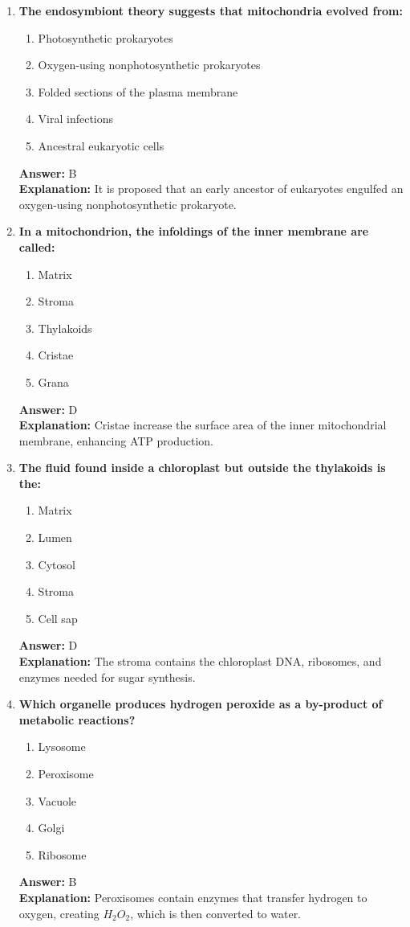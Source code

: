 \documentclass[11pt, a4paper]{article}
\begin{document}
\begin{enumerate}[leftmargin=*, label=\arabic*.]
\item \textbf{The endosymbiont theory suggests that mitochondria evolved from:}
\begin{enumerate}[label=\Alph*.]
\item Photosynthetic prokaryotes
\item Oxygen-using nonphotosynthetic prokaryotes
\item Folded sections of the plasma membrane
\item Viral infections
\item Ancestral eukaryotic cells
\end{enumerate}
\textbf{Answer:} B \\
\textbf{Explanation:} It is proposed that an early ancestor of eukaryotes engulfed an oxygen-using nonphotosynthetic prokaryote.

\item \textbf{In a mitochondrion, the infoldings of the inner membrane are called:}
\begin{enumerate}[label=\Alph*.]
\item Matrix
\item Stroma
\item Thylakoids
\item Cristae
\item Grana
\end{enumerate}
\textbf{Answer:} D \\
\textbf{Explanation:} Cristae increase the surface area of the inner mitochondrial membrane, enhancing ATP production.

\item \textbf{The fluid found inside a chloroplast but outside the thylakoids is the:}
\begin{enumerate}[label=\Alph*.]
\item Matrix
\item Lumen
\item Cytosol
\item Stroma
\item Cell sap
\end{enumerate}
\textbf{Answer:} D \\
\textbf{Explanation:} The stroma contains the chloroplast DNA, ribosomes, and enzymes needed for sugar synthesis.

\item \textbf{Which organelle produces hydrogen peroxide as a by-product of metabolic reactions?}
\begin{enumerate}[label=\Alph*.]
\item Lysosome
\item Peroxisome
\item Vacuole
\item Golgi
\item Ribosome
\end{enumerate}
\textbf{Answer:} B \\
\textbf{Explanation:} Peroxisomes contain enzymes that transfer hydrogen to oxygen, creating $H_2O_2$, which is then converted to water.


\end{enumerate}
\end{document}
